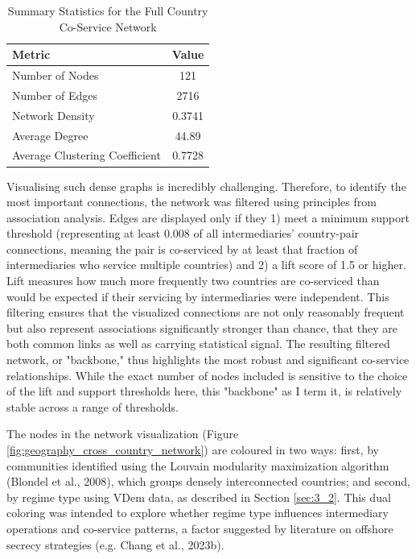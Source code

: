 \begin{table}[htbp]
\centering
\caption{Summary Statistics for the Full Country Co-Service Network}
\label{tab:country_network_summary}
\begin{tabular}{lc}
\toprule
\textbf{Metric}                        & \textbf{Value}    \\
\midrule
Number of Nodes               & 121      \\
Number of Edges               & 2716     \\
Network Density               & 0.3741   \\
Average Degree                & 44.89    \\
Average Clustering Coefficient & 0.7728   \\
\bottomrule
\end{tabular}
\end{table}

Visualising such dense graphs is incredibly challenging. Therefore, to identify the most important connections, the network was filtered using principles from association analysis. Edges are displayed only if they 1) meet a minimum support threshold (representing at least 0.008 of all intermediaries' country-pair connections, meaning the pair is co-serviced by at least that fraction of intermediaries who service multiple countries) and 2) a lift score of 1.5 or higher. Lift measures how much more frequently two countries are co-serviced than would be expected if their servicing by intermediaries were independent. This filtering ensures that the visualized connections are not only reasonably frequent but also represent associations significantly stronger than chance, that they are both common links as well as carrying statistical signal. The resulting filtered network, or "backbone," thus highlights the most robust and significant co-service relationships. While the exact number of nodes included is sensitive to the choice of the lift and support thresholds here, this "backbone" as I term it, is relatively stable across a range of thresholds.

The nodes in the network visualization (Figure \ref{fig:geography_cross_country_network}) are coloured in two ways: first, by communities identified using the Louvain modularity maximization algorithm (Blondel et al., 2008), which groups densely interconnected countries; and second, by regime type using VDem data, as described in Section \ref{sec:3_2}. This dual coloring was intended to explore whether regime type influences intermediary operations and co-service patterns, a factor suggested by literature on offshore secrecy strategies (e.g. Chang et al., 2023b).

